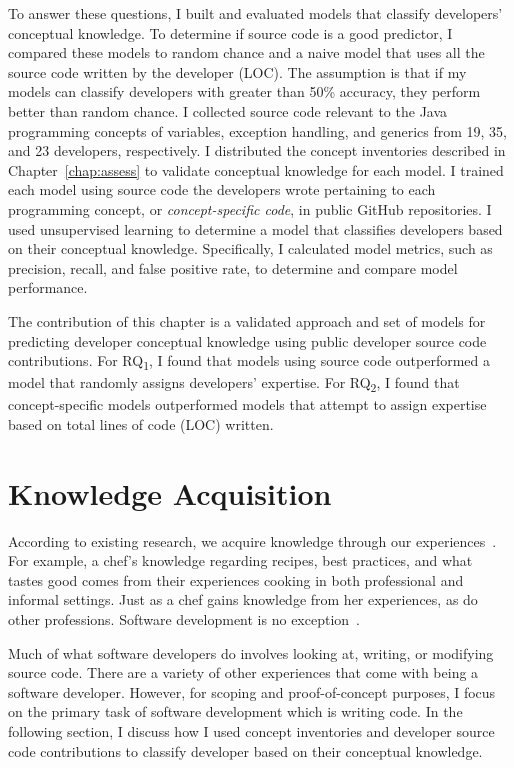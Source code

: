 To answer these questions, I built and evaluated models that classify developers' conceptual knowledge. To determine if source code is a good predictor, I compared these models to random chance and a naive model that uses all the source code written by the developer (LOC).
The assumption is that if my models can classify developers with greater than 50\% accuracy, they perform better than random chance.
I collected source code relevant to the Java programming concepts of variables, exception handling, and generics from 19, 35, and 23 developers, respectively. 
I distributed the concept inventories described in Chapter~\ref{chap:assess} to validate conceptual knowledge for each model. 
I trained each model using source code the developers wrote pertaining to each programming concept, or \textit{concept-specific code}, in public GitHub repositories. 
I used unsupervised learning to determine a model that classifies developers based on their conceptual knowledge. 
Specifically, I calculated model metrics, such as precision, recall, and false positive rate, to determine and compare model performance.

The contribution of this chapter is a validated approach and set of models for predicting developer conceptual knowledge using public developer source code contributions. For RQ\textsubscript{1}, I found that models using source code outperformed a model that randomly assigns developers' expertise. For RQ\textsubscript{2}, I found that concept-specific models outperformed models that attempt to assign expertise based on total lines of code (LOC) written.

\section{Knowledge Acquisition}
According to existing research, we acquire knowledge through our experiences~\cite{argote2011organizational}. For example, a chef's knowledge regarding recipes, best practices, and what tastes good comes from their experiences cooking in both professional and informal settings. Just as a chef gains knowledge from her experiences, as do other professions. Software development is no exception~\cite{fritz2010degree}.

Much of what software developers do involves looking at, writing, or modifying source code. 
There are a variety of other experiences that come with being a software developer. However, for scoping and proof-of-concept purposes, I focus on the primary task of software development which is writing code.
In the following section, I discuss how I used concept inventories and developer source code contributions to classify developer based on their conceptual knowledge.

